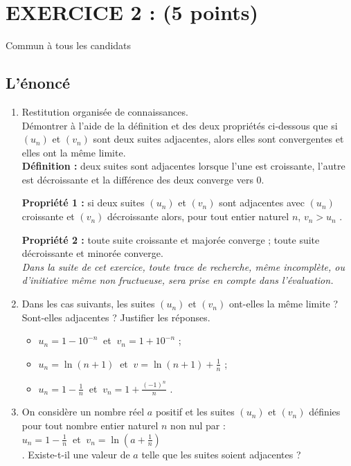 \documentclass[a4paper,11pt]{book}
\begin{document}
\section{EXERCICE 2 : (5 points)} 
Commun \`a tous les candidats
\subsection{L'\'enonc\'e}
\begin{enumerate}    
\item  Restitution organis\'ee de connaissances.\\
D\'emontrer \`a l'aide de la d\'efinition et des deux propri\'et\'es ci-dessous
que si $(u_n)$ et $(v_n)$ sont deux suites adjacentes, alors elles sont 
convergentes et elles ont la m\^eme limite.\\

{\bf D\'efinition :} deux suites sont adjacentes lorsque l'une est 
croissante, l'autre est d\'ecroissante et la diff\'erence des deux converge 
vers 0.

{\bf Propri\'et\'e 1 :} si deux suites $(u_n)$ et $(v_n)$ sont adjacentes avec 
$(u_n)$ croissante et $(v_n)$ d\'ecroissante alors, pour tout entier naturel 
$n$, $v_n > u_n$ .

{\bf Propri\'et\'e 2 :} toute suite croissante et major\'ee converge ; toute 
suite d\'ecroissante et minor\'ee converge.\\

{\it Dans la suite de cet exercice, toute trace de recherche, m\^eme incompl\`ete, ou d'initiative m\^eme non fructueuse, sera prise en compte dans l'\'evaluation.}
\item Dans les cas suivants, les suites $(u_n)$ et $(v_n)$ ont-elles la m\^eme 
limite ? Sont-elles adjacentes ? Justifier les r\'eponses.
\begin{itemize}
\item[$a)$] $u_n=1-10^{-n}\ $ et $\ v_n=1+10^{-n}$ ;
\item[$b)$] $u_n=\ln(n+1)\ $ et $\ \displaystyle v=\ln(n+1)+\frac{1}{n}$        ;
\item[$c)$] $\displaystyle u_n=1-\frac{1}{n}\ $ et $\ \displaystyle v_n=1+\frac{(-1)^n}{n}$            .
\end{itemize}
\item On consid\`ere un nombre r\'eel $a$ positif et les suites $(u_n)$ et 
$(v_n)$ d\'efinies pour tout nombre entier naturel $n$ non nul par : \\
$\displaystyle u_n=1-\frac{1}{n}\ $  et  $\ \displaystyle v_n=\ln(a+\frac{1}{n})$\\.
Existe-t-il une valeur de $a$ telle que les suites soient adjacentes ?
\end{enumerate}
\end{document}
